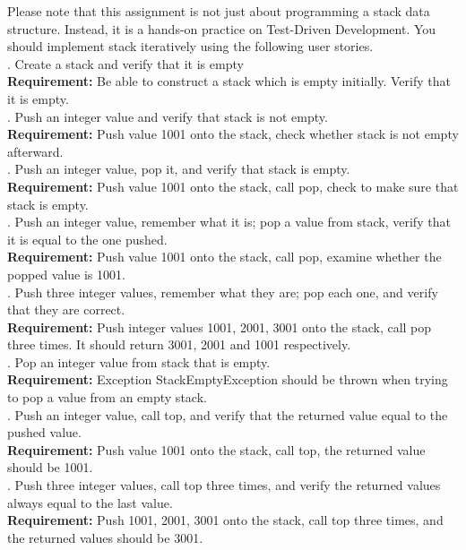 \noindent Please note that this assignment is not just about programming a stack data structure. Instead, it is a hands-on practice on Test-Driven Development. You should implement stack iteratively using the following user stories.\\

. Create a stack and verify that it is empty\\
\textbf{Requirement:} Be able to construct a stack which is empty initially. Verify that it is empty.\\

. Push an integer value and verify that stack is not empty. \\
\textbf{Requirement:} Push value 1001 onto the stack, check whether stack is not empty afterward.\\

. Push an integer value, pop it, and verify that stack is empty. \\
\textbf{Requirement:} Push value 1001 onto the stack, call pop, check to make sure that stack is empty.\\

. Push an integer value, remember what it is; pop a value from stack, verify that it is equal to the one pushed. \\
\textbf{Requirement:} Push value 1001 onto the stack, call pop, examine whether the popped value is 1001.\\

. Push three integer values, remember what they are; pop each one, and verify that they are correct. \\
\textbf{Requirement:} Push integer values 1001, 2001, 3001 onto the stack, call pop three times. It should return 3001, 2001 and 1001 respectively.\\

. Pop an integer value from stack that is empty. \\
\textbf{Requirement:} Exception StackEmptyException should be thrown when trying to pop a value from an empty stack.\\

. Push an integer value, call top, and verify that the returned value equal to the pushed value. \\
\textbf{Requirement:} Push value 1001 onto the stack, call top, the returned value should be  1001.\\

. Push three integer values, call top three times, and verify the returned values always equal to the last value. \\
\textbf{Requirement:} Push 1001, 2001, 3001 onto the stack, call top three times, and the returned values should be 3001.\\


